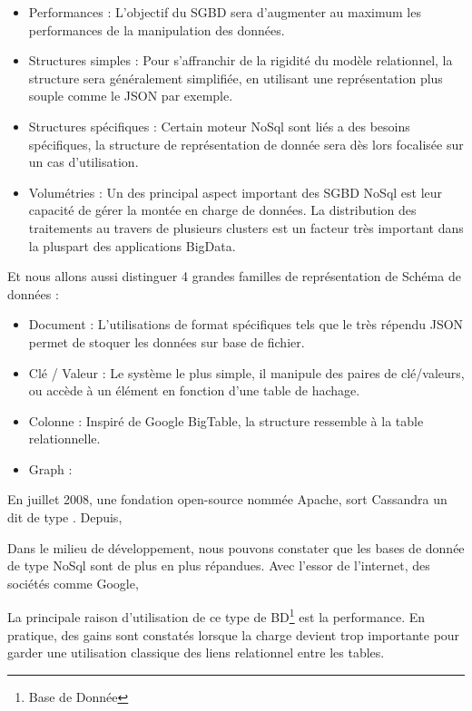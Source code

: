\documentclass[a4paper,12pt,twoside, fleqn]{report}
\begin{document}
\begin{itemize}
\item Performances : L'objectif du SGBD sera d'augmenter au maximum les performances de la manipulation des données. 
\item Structures simples : Pour s'affranchir de la rigidité du modèle relationnel, la structure sera généralement simplifiée, en utilisant une représentation plus souple comme le JSON par exemple.
\item Structures spécifiques : Certain moteur NoSql sont liés a des besoins spécifiques, la structure de représentation de donnée sera dès lors focalisée sur un cas d'utilisation.
\item Volumétries : Un des principal aspect important des SGBD NoSql est leur capacité de gérer la montée en charge de données. La distribution des traitements au travers de plusieurs clusters est un facteur très important dans la pluspart des applications BigData.
\end{itemize} 

Et nous allons aussi distinguer 4 grandes familles de représentation de Schéma de données :

\begin{itemize}
\item Document : L'utilisations de format spécifiques tels que le très répendu JSON permet de stoquer les données sur base de fichier.
\item Clé / Valeur : Le système le plus simple, il manipule des paires de clé/valeurs, ou accède à un élément en fonction d'une table de hachage.
\item Colonne : Inspiré de Google BigTable, la structure ressemble à la table relationnelle. 
\item Graph :
\end{itemize} 
 
En juillet 2008, une fondation open-source nommée Apache, sort Cassandra un  dit de type . Depuis, 

Dans le milieu de développement, nous pouvons constater que les bases de donnée de type NoSql sont de plus en plus répandues. Avec l'essor de l'internet, des sociétés comme Google, 

La principale raison d'utilisation de ce type de BD\footnote{Base de Donnée} est la performance. En pratique, des gains sont constatés lorsque la charge devient trop importante pour garder une utilisation classique des liens relationnel entre les tables.
 
\end{document}
